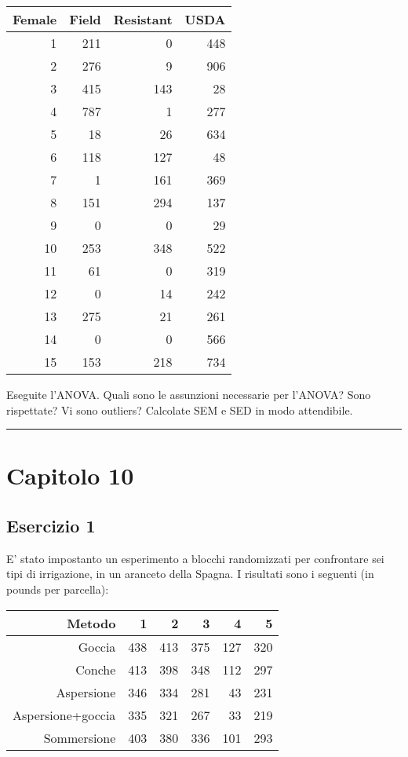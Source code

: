 \documentclass[a4paper,12pt,oneside]{book}
\begin{document}
\begin{longtable}[]{@{}rrrr@{}}
\toprule
Female & Field & Resistant & USDA \\
\midrule
\endhead
1 & 211 & 0 & 448 \\
2 & 276 & 9 & 906 \\
3 & 415 & 143 & 28 \\
4 & 787 & 1 & 277 \\
5 & 18 & 26 & 634 \\
6 & 118 & 127 & 48 \\
7 & 1 & 161 & 369 \\
8 & 151 & 294 & 137 \\
9 & 0 & 0 & 29 \\
10 & 253 & 348 & 522 \\
11 & 61 & 0 & 319 \\
12 & 0 & 14 & 242 \\
13 & 275 & 21 & 261 \\
14 & 0 & 0 & 566 \\
15 & 153 & 218 & 734 \\
\bottomrule
\end{longtable}

Eseguite l'ANOVA. Quali sono le assunzioni necessarie per l'ANOVA? Sono rispettate? Vi sono outliers? Calcolate SEM e SED in modo attendibile.

\begin{center}\rule{0.5\linewidth}{0.5pt}\end{center}

\hypertarget{capitolo-10}{%
\section{Capitolo 10}\label{capitolo-10}}

\hypertarget{esercizio-1-6}{%
\subsection{Esercizio 1}\label{esercizio-1-6}}

E' stato impostanto un esperimento a blocchi randomizzati per confrontare sei tipi di irrigazione, in un aranceto della Spagna. I risultati sono i seguenti (in pounds per parcella):

\begin{longtable}[]{@{}rrrrrr@{}}
\toprule
Metodo & 1 & 2 & 3 & 4 & 5 \\
\midrule
\endhead
Goccia & 438 & 413 & 375 & 127 & 320 \\
Conche & 413 & 398 & 348 & 112 & 297 \\
Aspersione & 346 & 334 & 281 & 43 & 231 \\
Aspersione+goccia & 335 & 321 & 267 & 33 & 219 \\
Sommersione & 403 & 380 & 336 & 101 & 293 \\
\bottomrule
\end{longtable}
\end{document}
